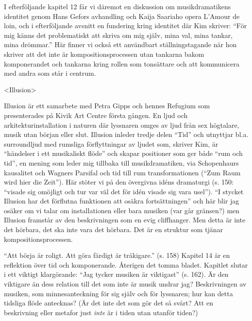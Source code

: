 \documentclass{article}
\begin{document}
I efterföljande kapitel 12 får vi däremot en diskussion om musikdramatikens identitet genom Hans Gefors avhandling och Kaija Saariaho opera L'Amour de loin, och i efterföljande avsnitt en fundering kring identitet där Kim skriver: ``För mig känns det problematiskt att skriva om mig själv, mina val, mina tankar, mina drömmar.'' Här finner vi också ett användbart ställningstagande när hon skriver att det inte är kompositionsprocessen utan tankarna bakom komponerandet och tankarna kring rollen som tonsättare och att kommunicera med andra som står i centrum.

\textless{}Illusion\textgreater{}

Illusion är ett samarbete med Petra Gipps och hennes Refugium som presenterades på Kivik Art Centre första gången. En ljud och arkitekturinstallation i naturen där lyssnaren omges av ljud från sex högtalare, musik utan början eller slut. Illusion inleder tredje delen ``Tid'' och utnyttjar bl.a. surroundljud med rumsliga förflyttningar av ljudet som, skriver Kim, är ``händelser i ett musikaliskt flöde'' och skapar positioner som ger både ``rum och tid'', en mening som leder mig tillbaka till musikdramatiken, via Schopenhaurs kausalitet och Wagners Parsifal och tid till rum transformationen (``Zum Raum wird hier die Zeit''). Här stöter vi på den övergivna idéns dramaturgi (s. 150: ``visade sig omöjligt och tur var väl det för idén visade sig vara usel''). ``I stycket Illusion har det förflutna funktionen att osäkra fortsättningen'' och här blir jag osäker om vi talar om installationen eller bara musiken (var går gränsen?) men Illusion framstår av den beskrivningen som en evig cliffhanger. Men detta är inte det hörbara, det ska inte vara det hörbara. Det är en struktur som tjänar kompositionsprocessen.

``Att börja är roligt. Att göra färdigt är tråkigare.'' (s. 158) Kapitel 14 är en reflektion över tid och komponerande. Återigen det tomma bladet. Kapitlet slutar i ett viktigt klargörande: ``Jag tycker musiken är viktigast'' (s. 162). Är den viktigare än dess relation till det som inte är musik undrar jag? Beskrivningen av musiken, som minnesanteckning för sig själv och för lyssnaren; hur kan detta tidsliga flöde antecknas? (Är det inte det som gör det så svårt? Att en beskrivning eller metafor just \emph{inte} är i tiden utan utanför tiden?)
\end{document}
